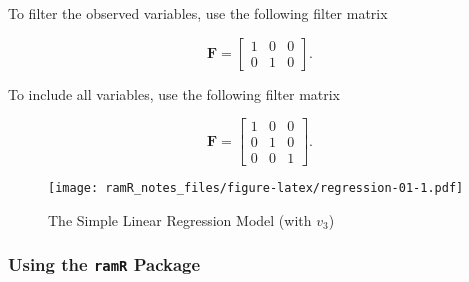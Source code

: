 \documentclass[
]{book}
\newenvironment{Shaded}{\begin{snugshade}}{\end{snugshade}}
\newcommand{\AttributeTok}[1]{\textcolor[rgb]{0.77,0.63,0.00}{#1}}
\newcommand{\ConstantTok}[1]{\textcolor[rgb]{0.00,0.00,0.00}{#1}}
\newcommand{\FunctionTok}[1]{\textcolor[rgb]{0.00,0.00,0.00}{#1}}
\newcommand{\NormalTok}[1]{#1}
\newcommand{\SpecialCharTok}[1]{\textcolor[rgb]{0.00,0.00,0.00}{#1}}
\newcommand{\StringTok}[1]{\textcolor[rgb]{0.31,0.60,0.02}{#1}}
\begin{document}
To filter the observed variables, use the following filter matrix

\begin{equation}
  \mathbf{F}
  =
  \begin{bmatrix}
    1 & 0 & 0 \\
    0 & 1 & 0
  \end{bmatrix} .
\end{equation}

To include all variables, use the following filter matrix

\begin{equation}
  \mathbf{F}
  =
  \begin{bmatrix}
    1 & 0 & 0 \\
    0 & 1 & 0 \\
    0 & 0 & 1
  \end{bmatrix} .
\end{equation}

\begin{figure}
\centering
\texttt{[image: ramR\_notes\_files/figure-latex/regression-01-1.pdf]}
\caption{\label{fig:regression-01}The Simple Linear Regression Model (with \(v_3\))}
\end{figure}

\hypertarget{using-the-ramr-package}{%
\subsubsection{\texorpdfstring{Using the \texttt{ramR} Package}{Using the ramR Package}}\label{using-the-ramr-package}}

\begin{Shaded}
\end{Shaded}
\end{document}
